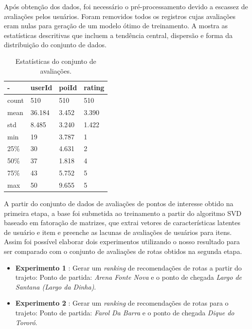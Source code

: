 \documentclass[portuguese]{textolivre}
\begin{document}
Após obtenção dos dados, foi necessário o pré-processamento devido a escassez de avaliações pelos usuários. Foram removidos todos os registros cujas avaliações eram nulas para geração de um modelo ótimo de treinamento. A  mostra as estatísticas descritivas que incluem a tendência central, dispersão e forma da distribuição do conjunto de dados. 
\begin{table}[htpb]
\centering
\begin{threeparttable}
\caption{Estatísticas do conjunto de avaliações.}
\label{tbl-tabela-6}
\begin{tabular}{p{4cm}lll}
\toprule 
- & userId & poiId & rating \\
\midrule
count     & 510   & 510 & 510      \\
mean      & 36.184   & 3.452 & 3.390 \\
std       & 8.485 & 3.240 & 1.422     \\
min       & 19 & 3.787 & 1       \\
25\%      & 30 & 4.631 & 2         \\
50\%      & 37 & 1.818 & 4         \\
75\%      & 43 & 5.752 & 5         \\
max       & 50 & 9.655 & 5         \\
\bottomrule
\end{tabular}
\end{threeparttable}
\end{table}


A partir do conjunto de dados de avaliações de pontos de interesse obtido na primeira etapa, a base foi submetida ao treinamento a partir do algoritmo SVD baseado em fatoração de matrizes, que extrai vetores de características latentes de usuário e item e preenche as lacunas de avaliações de usuários para itens. Assim foi possível elaborar dois experimentos utilizando o nosso resultado para ser comparado com o conjunto de avaliações de rotas obtidos na segunda etapa.


\begin{itemize}
    \item \textbf{Experimento 1} : Gerar um \textit{ranking} de recomendações de rotas a partir do trajeto: Ponto de partida: \textit{Arena Fonte Nova} e o ponto de chegada \textit{Largo de Santana (Largo da Dinha)}. 
    \item \textbf{Experimento 2} : Gerar um \textit{ranking} de recomendações de rotas para o trajeto: Ponto de partida: \textit{Farol Da Barra} e o ponto de chegada \textit{Dique do Tororó}.  
    
\end{itemize}
\end{document}
